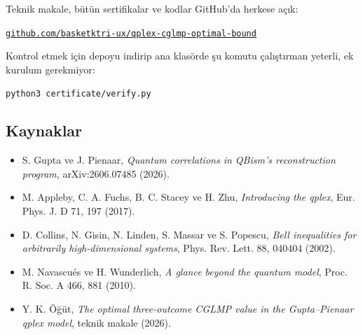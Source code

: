 \documentclass[11pt]{article}
\begin{document}
\begin{sezgi}
Teknik makale, bütün sertifikalar ve kodlar GitHub'da herkese açık:\par
\href{https://github.com/basketktri-ux/qplex-cglmp-optimal-bound}{\color{ana}\texttt{github.com/basketktri-ux/qplex-cglmp-optimal-bound}}\par
Kontrol etmek için depoyu indirip ana klasörde şu komutu çalıştırman yeterli, ek kurulum gerekmiyor:\par
\texttt{python3 certificate/verify.py}
\end{sezgi}

\subsection*{Kaynaklar}
{\small
\begin{itemize}[leftmargin=*,itemsep=1pt]
  \item S. Gupta ve J. Pienaar, \emph{Quantum correlations in QBism's reconstruction program}, arXiv:2606.07485 (2026).
  \item M. Appleby, C. A. Fuchs, B. C. Stacey ve H. Zhu, \emph{Introducing the qplex}, Eur. Phys. J. D 71, 197 (2017).
  \item D. Collins, N. Gisin, N. Linden, S. Massar ve S. Popescu, \emph{Bell inequalities for arbitrarily high-dimensional systems}, Phys. Rev. Lett. 88, 040404 (2002).
  \item M. Navascués ve H. Wunderlich, \emph{A glance beyond the quantum model}, Proc. R. Soc. A 466, 881 (2010).
  \item Y. K. Öğüt, \emph{The optimal three-outcome CGLMP value in the Gupta–Pienaar qplex model}, teknik makale (2026).
\end{itemize}}
\end{document}
